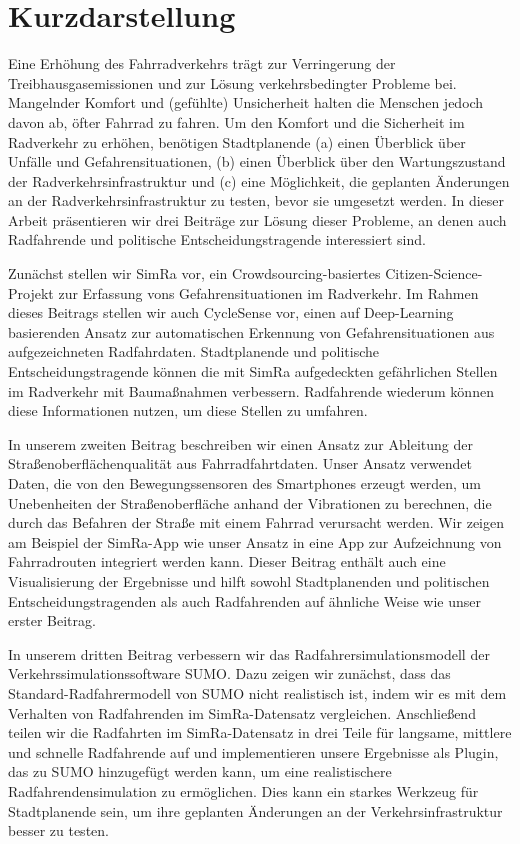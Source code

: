 \newpage
{}
\section*{Kurzdarstellung}
Eine Erhöhung des Fahrradverkehrs trägt zur Verringerung der Treibhausgasemissionen und zur Lösung verkehrsbedingter Probleme bei.
Mangelnder Komfort und (gefühlte) Unsicherheit halten die Menschen jedoch davon ab, öfter Fahrrad zu fahren.
Um den Komfort und die Sicherheit im Radverkehr zu erhöhen, benötigen Stadtplanende (a) einen Überblick über Unfälle und Gefahrensituationen, (b) einen Überblick über den Wartungszustand der Radverkehrsinfrastruktur und (c) eine Möglichkeit, die geplanten Änderungen an der Radverkehrsinfrastruktur zu testen, bevor sie umgesetzt werden.
In dieser Arbeit präsentieren wir drei Beiträge zur Lösung dieser Probleme, an denen auch Radfahrende und politische Entscheidungstragende interessiert sind.

Zunächst stellen wir SimRa vor, ein Crowdsourcing-basiertes Citizen-Science-Projekt zur Erfassung vons Gefahrensituationen im Radverkehr.
Im Rahmen dieses Beitrags stellen wir auch CycleSense vor, einen auf Deep-Learning basierenden Ansatz zur automatischen Erkennung von Gefahrensituationen aus aufgezeichneten Radfahrdaten.
Stadtplanende und politische Entscheidungstragende können die mit SimRa aufgedeckten gefährlichen Stellen im Radverkehr mit Baumaßnahmen verbessern.
Radfahrende wiederum können diese Informationen nutzen, um diese Stellen zu umfahren.

In unserem zweiten Beitrag beschreiben wir einen Ansatz zur Ableitung der Straßenoberflächenqualität aus Fahrradfahrtdaten.
Unser Ansatz verwendet Daten, die von den Bewegungssensoren des Smartphones erzeugt werden, um Unebenheiten der Straßenoberfläche anhand der Vibrationen zu berechnen, die durch das Befahren der Straße mit einem Fahrrad verursacht werden. 
Wir zeigen am Beispiel der SimRa-App wie unser Ansatz in eine App zur Aufzeichnung von Fahrradrouten integriert werden kann.
Dieser Beitrag enthält auch eine Visualisierung der Ergebnisse und hilft sowohl Stadtplanenden und politischen Entscheidungstragenden als auch Radfahrenden auf ähnliche Weise wie unser erster Beitrag.

In unserem dritten Beitrag verbessern wir das Radfahrersimulationsmodell der Verkehrssimulationssoftware SUMO.
Dazu zeigen wir zunächst, dass das Standard-Radfahrermodell von SUMO nicht realistisch ist, indem wir es mit dem Verhalten von Radfahrenden im SimRa-Datensatz vergleichen.
Anschließend teilen wir die Radfahrten im SimRa-Datensatz in drei Teile für langsame, mittlere und schnelle Radfahrende auf und implementieren unsere Ergebnisse als Plugin, das zu SUMO hinzugefügt werden kann, um eine realistischere Radfahrendensimulation zu ermöglichen.
Dies kann ein starkes Werkzeug für Stadtplanende sein, um ihre geplanten Änderungen an der Verkehrsinfrastruktur besser zu testen. 